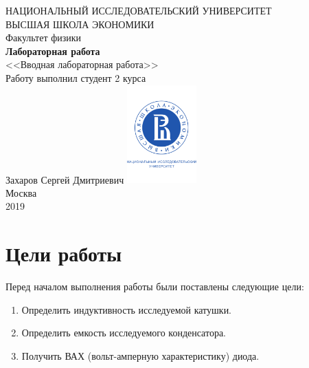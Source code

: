 \documentclass[a4paper, 12pt]{article}
\begin{document}
	\begin{titlepage}
		\begin{center}
			$$$$
			$$$$
			$$$$
			$$$$
			{\Large{НАЦИОНАЛЬНЫЙ ИССЛЕДОВАТЕЛЬСКИЙ УНИВЕРСИТЕТ}}\\
			\vspace{0.1cm}
			{\Large{ВЫСШАЯ ШКОЛА ЭКОНОМИКИ}}\\
			\vspace{0.25cm}
			{\large{Факультет физики}}\\
			\vspace{5.5cm}
			{\Huge\textbf{{Лабораторная работа}}}\\%
			\vspace{1cm}
			{\LARGE{<<Вводная лабораторная работа>>}}\\%
			\vspace{2cm}
			{Работу выполнил студент 2 курса}\\
			{Захаров Сергей Дмитриевич}
			\vfill
			\includegraphics[width = 0.2\textwidth]{HSElogo}\\
			\vfill
			Москва\\
			2019
		\end{center}
	\end{titlepage}

\tableofcontents

\newpage

\section{Цели работы}

Перед началом выполнения работы были поставлены следующие цели:

\begin{enumerate}
	\item Определить индуктивность исследуемой катушки.
	
	\item Определить емкость исследуемого конденсатора.
	
	\item Получить ВАХ (вольт-амперную характеристику) диода.
\end{enumerate}
\end{document}
